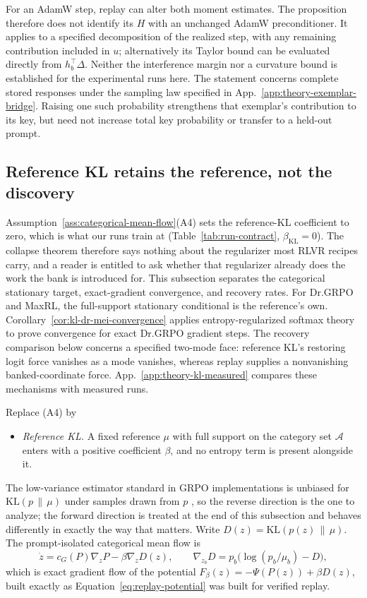 \documentclass{article}
\newcommand{\1}{\mathbf 1}
\theoremstyle{remark}
\theoremstyle{definition}
\theoremstyle{plain}
\begin{document}
For an AdamW step, replay can alter both moment estimates. The proposition
therefore does not identify its $H$ with an unchanged AdamW preconditioner.
It applies to a specified decomposition of the realized step, with any
remaining contribution included in $u$; alternatively its Taylor bound can
be evaluated directly from $h_b^\top\Delta$. Neither the interference margin
nor a curvature bound is established for the experimental runs here.
The statement concerns complete stored responses under the sampling law
specified in App.~\ref{app:theory-exemplar-bridge}. Raising one such
probability strengthens that exemplar's contribution to its key, but need
not increase total key probability or transfer to a held-out prompt.


\subsection{Reference KL retains the reference, not the discovery}
\label{app:theory-kl}

Assumption~\ref{ass:categorical-mean-flow}(A4) sets the reference-KL
coefficient to zero, which is what our runs train at
(Table~\ref{tab:run-contract}, $\beta_{\mathrm{KL}}=0$). The collapse theorem
therefore says nothing about the regularizer most RLVR recipes carry, and a
reader is entitled to ask whether that regularizer already does the work the
bank is introduced for. This subsection separates the categorical stationary target, exact-gradient
convergence, and recovery rates. For Dr.GRPO and MaxRL, the full-support
stationary conditional is the reference's own.
Corollary~\ref{cor:kl-dr-mei-convergence} applies entropy-regularized softmax
theory to prove convergence for exact Dr.GRPO gradient steps. The recovery
comparison below concerns a specified two-mode face: reference KL's
restoring logit force vanishes as a mode vanishes, whereas replay supplies
a nonvanishing banked-coordinate force.
App.~\ref{app:theory-kl-measured} compares these mechanisms with measured runs.

Replace (A4) by

\begin{itemize}
\item[(A4$'$)] \emph{Reference KL.} A fixed reference $\mu$ with full support
  on the category set $\mathcal A$ enters with a positive coefficient $\beta$,
  and no entropy term is present alongside it.
\end{itemize}
The low-variance estimator standard in GRPO implementations is unbiased for
$\mathrm{KL}(p\,\|\,\mu)$ under samples drawn from $p$
\citep{shao2024deepseekmath}, so the reverse direction is the one to analyze;
the forward direction is treated at the end of this subsection and behaves
differently in exactly the way that matters. Write
$D(z)=\mathrm{KL}(p(z)\,\|\,\mu)$. The prompt-isolated categorical mean flow is
\begin{equation}
  \dot z=c_G(P)\nabla_zP-\beta\nabla_zD(z),
  \qquad
  \nabla_{z_b}D=p_b\big(\log(p_b/\mu_b)-D\big),
  \label{eq:kl-mean-flow}
\end{equation}
which is exact gradient flow of the potential
$F_\beta(z)=-\Psi(P(z))+\beta D(z)$, built exactly as
Equation~\eqref{eq:replay-potential} was built for verified replay.
\end{document}
